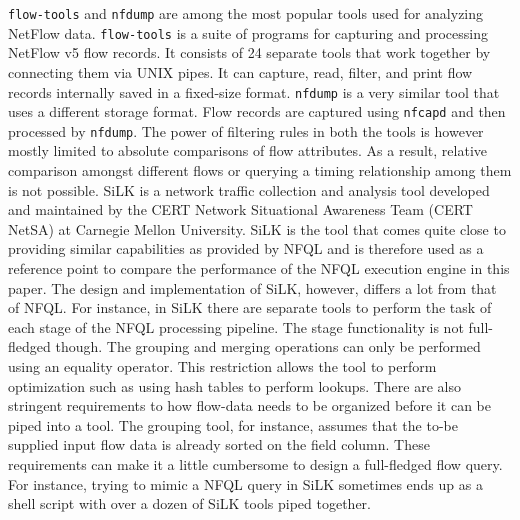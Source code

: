 \texttt{flow-tools} and \texttt{nfdump} are among the most popular tools used
for analyzing NetFlow data. \texttt{flow-tools} \cite{sromig:2000} is a suite
of programs for capturing and processing NetFlow v5 flow records. It consists
of 24 separate tools that work together by connecting them via UNIX pipes. It
can capture, read, filter, and print flow records internally saved in a
fixed-size format.  \texttt{nfdump} \cite{phaag:2006} is a very similar tool
that uses a different storage format. Flow records are captured using
\texttt{nfcapd} and then processed by \texttt{nfdump}. The power of filtering
rules in both the tools is however mostly limited to absolute comparisons of
flow attributes. As a result, relative comparison amongst different flows or
querying a timing relationship among them is not possible.  SiLK \cite{SiLK} is
a network traffic collection and analysis tool developed and maintained by the
CERT Network Situational Awareness Team (CERT NetSA) at Carnegie Mellon
University.  SiLK is the tool that comes quite close to providing similar
capabilities as provided by \ac{NFQL} and is therefore used as a reference
point to compare the performance of the \ac{NFQL} execution engine in this
paper. The design and implementation of SiLK, however, differs a lot from that
of \ac{NFQL}. For instance, in SiLK there are separate tools to perform the
task of each stage of the \ac{NFQL} processing pipeline. The stage
functionality is not full-fledged though. The grouping and merging operations
can only be performed using an equality operator. This restriction allows the
tool to perform optimization such as using hash tables to perform lookups.
There are also stringent requirements to how flow-data needs to be organized
before it can be piped into a tool. The grouping tool, for instance, assumes
that the to-be supplied input flow data is already sorted on the field column.
These requirements can make it a little cumbersome to design a full-fledged
flow query.  For instance, trying to mimic a \ac{NFQL} query in SiLK sometimes
ends up as a shell script with over a dozen of SiLK tools piped together.
